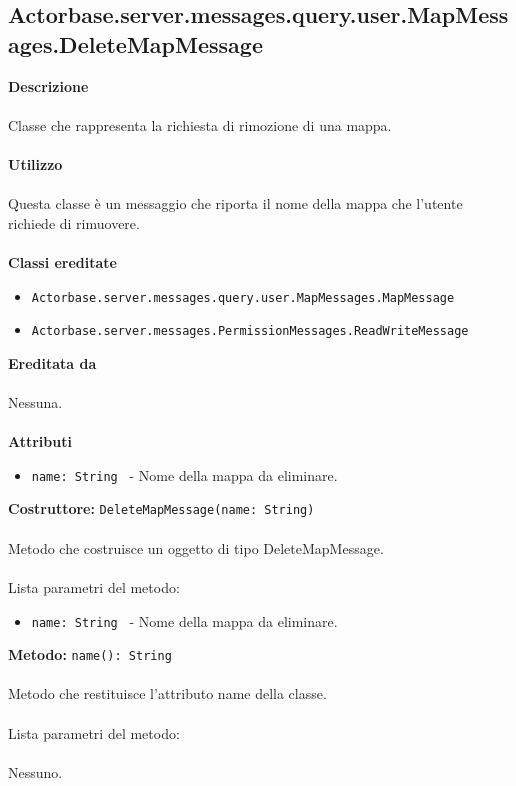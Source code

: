 \documentclass[a4paper]{article}
\begin{document}
	\subsection{Actorbase.server.messages.query.user.MapMessages.DeleteMapMessage}
		\textbf{Descrizione}
			\\ \\
		Classe che rappresenta la richiesta di rimozione di una mappa.
			\\ \\
		\textbf{Utilizzo}
			\\ \\
		Questa classe è un messaggio che riporta il nome della mappa che l'utente richiede di rimuovere.
			\\ \\
		\textbf{Classi ereditate}
			\begin{itemize}
				\item \texttt{Actorbase.server.messages.query.user.MapMessages.MapMessage }
				\item \texttt{Actorbase.server.messages.PermissionMessages.ReadWriteMessage }
			\end{itemize}
		\textbf{Ereditata da}
			\\ \\
			Nessuna.
			\\ \\
		\textbf{Attributi}
			\begin{itemize}
				\item \texttt{name: String } - Nome della mappa da eliminare.
			\end{itemize}
		\textbf{Costruttore: }\texttt{DeleteMapMessage(name: String)}
			\\ \\
		Metodo che costruisce un oggetto di tipo DeleteMapMessage.
			\\ \\
		Lista parametri del metodo:
			\begin{itemize}
				\item \texttt{name: String } - Nome della mappa da eliminare.
			\end{itemize}
		\textbf{Metodo: }\texttt{name(): String}
			\\ \\
		Metodo che restituisce l'attributo name della classe.
			\\ \\
		Lista parametri del metodo:
			\\ \\
			Nessuno.
			
\end{document}
